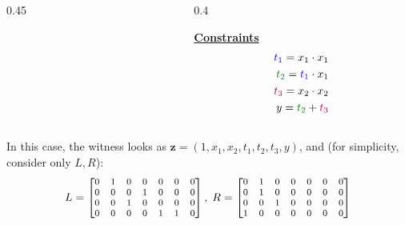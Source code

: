 \documentclass{zkdl-presentation-template}
\begin{document}
\begin{frame}
\begin{example}
\begin{columns}
\begin{column}{0.45\textwidth}
\begin{center}
{
        }
    \end{center}
\end{column}

\begin{column}{0.4\textwidth}
    \begin{center}
        \underline{\textbf{Constraints}}
        \begin{align*}
            \textcolor{blue}{t_1} = x_1 \cdot x_1 \\
            \textcolor{green!50!black}{t_2} = \textcolor{blue}{t_1} \cdot x_1 \\
            \textcolor{purple}{t_3} = x_2 \cdot x_2 \\
            y = \textcolor{green!50!black}{t_2} + \textcolor{purple}{t_3}
        \end{align*}
    \end{center}
\end{column}
\end{columns}

\vspace{10px}

 In this case, the witness looks as $\boldsymbol{z} = (1,x_1,x_2,t_1,t_2,t_3,y)$,
and (for simplicity, consider only $L,R$):
\begin{gather*}
    \footnotesize L = \begin{bmatrix}
        0 & 1 & 0 & 0 & 0 & 0 & 0\\
        0 & 0 & 0 & 1 & 0 & 0 & 0 \\
        0 & 0 & 1 & 0 & 0 & 0 & 0 \\
        0 & 0 & 0 & 0 & 1 & 1 & 0
    \end{bmatrix}, \; R = \begin{bmatrix}
        0 & 1 & 0 & 0 & 0 & 0 & 0\\
        0 & 1 & 0 & 0 & 0 & 0 & 0 \\
        0 & 0 & 1 & 0 & 0 & 0 & 0 \\
        1 & 0 & 0 & 0 & 0 & 0 & 0
    \end{bmatrix}
\end{gather*}

\end{example}

\end{frame}
\end{document}
